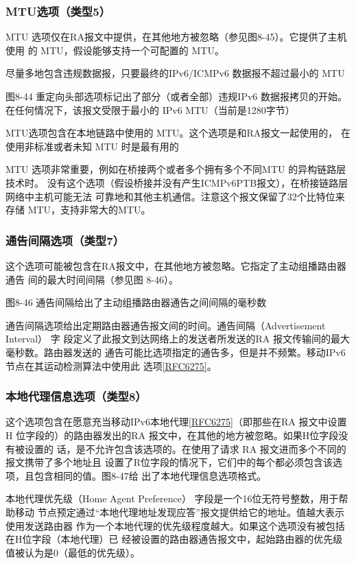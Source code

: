 \subsubsection{MTU选项（类型5）}

MTU 选项仅在RA报文中提供，在其他地方被忽略（参见图8-45）。它提供了主机使用
的 MTU，假设能够支持一个可配置的 MTU。

尽量多地包含违规数据报，只要最终的IPv6/ICMPv6 数据报不超过最小的 MTU

图8-44 重定向头部选项标记出了部分（或者全部）违规IPv6 数据报拷贝的开始。
在任何情况下，该报文受限于最小的 IPv6 MTU（当前是1280字节）

MTU选项包含在本地链路中使用的 MTU。这个选项是和RA报文一起使用的，
在使用非标准或者未知 MTU 时是最有用的

MTU 选项非常重要，例如在桥接两个或者多个拥有多个不同MTU 的异构链路层技术时。
没有这个选项（假设桥接并没有产生ICMPv6PTB报文），在桥接链路层网络中主机可能无法
可靠地和其他主机通信。注意这个报文保留了32个比特位来存储 MTU，支持非常大的MTU。

\subsubsection{通告间隔选项（类型7）}

这个选项可能被包含在RA报文中，在其他地方被忽略。它指定了主动组播路由器通告
间的最大时间间隔（参见图 8-46）。

图8-46 通告间隔给出了主动组播路由器通告之间间隔的毫秒数

通告间隔选项给出定期路由器通告报文间的时间。通告间隔（Advertisement Interval） 字
段定义了此报文到达网络上的发送者所发送的RA 报文传输间的最大毫秒数。路由器发送的
通告可能比选项指定的通告多，但是并不频繁。移动IPv6节点在其运动检测算法中使用此
选项\href{https://www.rfc-editor.org/rfc/rfc6275}{[RFC6275]}。

\subsubsection{本地代理信息选项（类型8）}
这个选项包含在愿意充当移动IPv6本地代理\href{https://www.rfc-editor.org/rfc/rfc6275}{[RFC6275]}（即那些在RA 报文中设置H
位字段的）的路由器发出的RA 报文中，在其他的地方被忽略。如果H位字段没有被设置的
话，是不允许包含该选项的。在使用了请求 RA 报文进而多个不同的报文携带了多个地址且
设置了R位字段的情况下，它们中的每个都必须包含该选项，且包含相同的值。图8-47给
出了本地代理信息选项格式。

本地代理优先级（Home Agent Preference） 字段是一个16位无符号整数，用于帮助移动
节点预定通过“本地代理地址发现应答”报文提供给它的地址。值越大表示使用发送路由器
作为一个本地代理的优先级程度越大。如果这个选项没有被包括在H位字段（本地代理）已
经被设置的路由器通告报文中，起始路由器的优先级值被认为是0（最低的优先级）。

